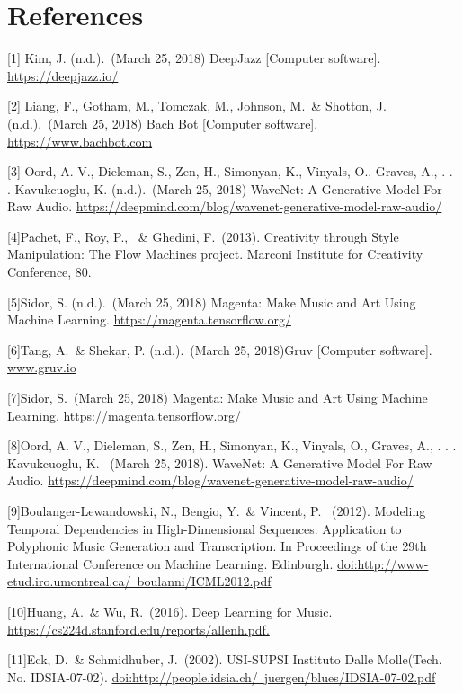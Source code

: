 \documentclass{article}
\begin{document}
\section*{References}

\medskip

\small
 
[1] Kim, J. (n.d.).\ (March 25, 2018) DeepJazz [Computer software]. \href{url}{https://deepjazz.io/}

[2] Liang, F., Gotham, M., Tomczak, M., Johnson, M.\ \& Shotton, J. (n.d.).\ (March 25, 2018) Bach Bot [Computer software]. \href{url}{https://www.bachbot.com}

[3] Oord, A. V., Dieleman, S., Zen, H., Simonyan, K., Vinyals, O., Graves, A., . . . Kavukcuoglu, K. (n.d.).\ (March 25, 2018) WaveNet: A Generative Model For Raw Audio. \href{url}{https://deepmind.com/blog/wavenet-generative-model-raw-audio/}

[4]Pachet, F., Roy, P., \ \& Ghedini, F.\ (2013). Creativity through Style Manipulation: The Flow Machines project. Marconi Institute for Creativity Conference, 80.

[5]Sidor, S. (n.d.).\ (March 25, 2018) Magenta: Make Music and Art Using Machine Learning.  \href{url}{https://magenta.tensorflow.org/}

[6]Tang, A.\ \& Shekar, P. (n.d.).\ (March 25, 2018)Gruv [Computer software].  \href{url}{www.gruv.io}

[7]Sidor, S.\ (March 25, 2018) Magenta: Make Music and Art Using Machine Learning. \href{url}{https://magenta.tensorflow.org/}

[8]Oord, A. V., Dieleman, S., Zen, H., Simonyan, K., Vinyals, O., Graves, A., . . . Kavukcuoglu, K. \ (March 25, 2018). WaveNet: A Generative Model For Raw Audio.  \href{url}{https://deepmind.com/blog/wavenet-generative-model-raw-audio/}

[9]Boulanger-Lewandowski, N., Bengio, Y.\ \& Vincent, P. \ (2012). Modeling Temporal Dependencies in High-Dimensional Sequences: Application to Polyphonic Music Generation and Transcription. In Proceedings of the 29th International Conference on Machine Learning. Edinburgh. \href{url}{doi:http://www-etud.iro.umontreal.ca/~boulanni/ICML2012.pdf}

[10]Huang, A.\ \& Wu, R.\ (2016). Deep Learning for Music. \href{url}{https://cs224d.stanford.edu/reports/allenh.pdf.}

[11]Eck, D.\ \& Schmidhuber, J.\ (2002). USI-SUPSI Instituto Dalle Molle(Tech. No. IDSIA-07-02). \href{url}{doi:http://people.idsia.ch/~juergen/blues/IDSIA-07-02.pdf}
\end{document}
